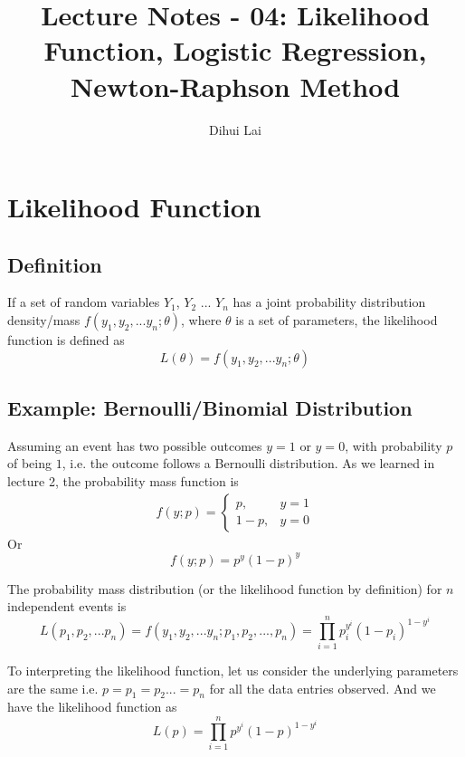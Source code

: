 \documentclass[12pt, oneside]{article}
\title{Lecture Notes - 04: Likelihood Function, Logistic Regression, Newton-Raphson Method}
\author{Dihui Lai}
\begin{document}
\maketitle
\tableofcontents

\vspace{.25in}

\section{Likelihood Function}
\subsection{Definition}
If a set of random variables $Y_1$, $Y_2$ ... $Y_n$ has a joint probability distribution density/mass $f(y_1, y_2, ...y_n;\theta)$, where $\theta$ is a set of parameters, the likelihood function is defined as 
\begin{equation}
L(\theta)=f(y_1, y_2, ...y_n; \theta)
\end{equation}

\subsection{Example: Bernoulli/Binomial Distribution}
Assuming an event has two possible outcomes $y=1$ or $y=0$, with probability $p$ of being $1$, i.e. the outcome follows a Bernoulli distribution. As we learned in lecture 2, the probability mass function is 
\begin{align*}
f(y; p)=
\begin{cases}
p, &y=1\\
1-p,  &y=0
\end{cases}
\end{align*}
Or 
$$f(y;p)=p^y(1-p)^y$$

The probability mass distribution (or the likelihood function by definition) for $n$ independent events is
$$L(p_1, p_2,...p_n)=f(y_1, y_2, ...y_n; p_1, p_2, ..., p_n)=\prod_{i=1}^{n}p_{i}^{y^i}(1-p_{i})^{1-y^{i}}$$

To interpreting the likelihood function, let us consider the underlying parameters are the same i.e. $p=p_1=p_2...=p_n$ for all the data entries observed. And we have the likelihood function as
$$L(p)={\prod_{i=1}^{n}p^{y^i}(1-p)^{1-y^{i}}}$$
\end{document}
